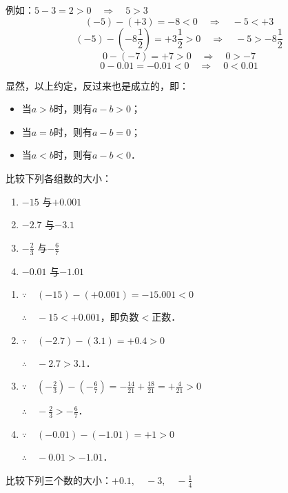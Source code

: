 例如：$5-3=2>0 \quad \Rightarrow\quad 5>3$
\[(-5)-(+3)=-8<0 \quad \Rightarrow\quad -5<+3\]
\[(-5)-\left(-8\frac{1}{2}\right)=+3\frac{1}{2}>0 \quad \Rightarrow\quad -5>-8\frac{1}{2}\]
\[0-(-7)=+7>0 \quad \Rightarrow\quad 0>-7\]
\[0-0.01=-0.01<0 \quad \Rightarrow\quad 0<0.01\]

显然，以上约定，反过来也是成立的，即：
\begin{itemize}
    \item 当$a>b$时，则有$a-b>0$；
    \item     当$a =b$时，则有$a-b=0$；
    \item     当$a<b$时，则有$a-b<0$．
\end{itemize}

\begin{example}
    比较下列各组数的大小：
   \begin{multicols}{2}
\begin{enumerate}
    \item $-15$ 与$+0.001$
    \item $-2.7$ 与$-3.1$
    \item $-\frac{2}{3}$ 与$-\frac{6}{7}$
    \item $-0.01$ 与$-1.01$
\end{enumerate}
   \end{multicols}
\end{example}

\begin{solution}
\begin{enumerate}
    \item $\because\quad (-15)-(+0.001)=-15.001<0$

$\therefore\quad -15<+0.001$，即负数$<$正数．

\item $\because\quad (-2.7)-(3.1)=+0.4>0$

$\therefore\quad -2.7>3.1$．

\item $\because\quad \left(-\frac{2}{3}\right)-\left(-\frac{6}{7}\right)=-\frac{14}{21}+\frac{18}{21}=+\frac{4}{21}>0$

$\therefore\quad -\frac{2}{3}>-\frac{6}{7}$．

\item $\because\quad (-0.01)-(-1.01)=+1>0$

$\therefore\quad -0.01>-1.01$．
\end{enumerate}    
\end{solution}

\begin{example}
比较下列三个数的大小：$+0.1,\quad -3,\quad -\frac{1}{4}$
\end{example}

